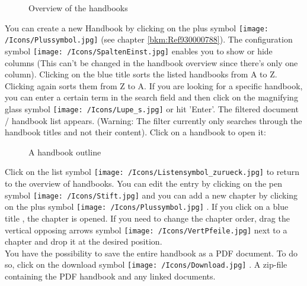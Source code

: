 \begin{figure}[H]
\caption{Overview of the handbooks}
\end{figure}

You can create a new Handbook by clicking on the plus symbol \texttt{[image: /Icons/Plussymbol.jpg]}  (see chapter \ref{bkm:Ref930000788}). The configuration symbol \texttt{[image: /Icons/SpaltenEinst.jpg]}  enables you to show or hide columns (This can't be changed in the handbook overview since there's only one column). Clicking on the blue title  sorts the listed handbooks from A to Z. Clicking again sorts them from Z to A. If you are looking for a specific handbook, you can enter a certain term in the search field  and then click on the magnifying glass symbol \texttt{[image: /Icons/Lupe\_s.jpg]} or hit 'Enter'. The filtered document / handbook list appears. (Warning: The filter currently only searches through the handbook titles and not their content). Click on a handbook  to open it:

\begin{figure}[H]
\caption{A handbook outline}
\end{figure}

Click on the list symbol \texttt{[image: /Icons/Listensymbol\_zurueck.jpg]}  to return to the overview of handbooks. You can edit the entry by clicking on the pen symbol \texttt{[image: /Icons/Stift.jpg]}  and you can add a new chapter by clicking on the plus symbol \texttt{[image: /Icons/Plussymbol.jpg]} . If you click on a blue title , the chapter is opened. If you need to change the chapter order, drag the vertical opposing arrows symbol \texttt{[image: /Icons/VertPfeile.jpg]}  next to a chapter and drop it at the desired position. \\
You have the possibility to save the entire handbook as a PDF document. To do so, click on the download symbol \texttt{[image: /Icons/Download.jpg]} . A zip-file containing the PDF handbook and any linked documents.

